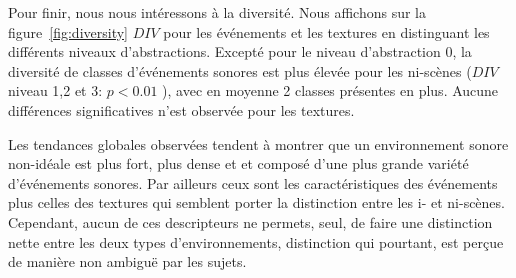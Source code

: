 Pour finir, nous nous intéressons à la diversité. Nous affichons sur la figure~\ref{fig:diversity} $DIV$ pour les événements et les textures en distinguant les différents niveaux d'abstractions. Excepté pour le niveau d'abstraction 0, la diversité de classes d'événements sonores est plus élevée pour les ni-scènes ($DIV$ niveau 1,2 et 3: $p<0.01$ ), avec en moyenne 2 classes présentes en plus. Aucune différences significatives n'est observée pour les textures.

Les tendances globales observées tendent à montrer que un environnement sonore non-idéale est plus fort, plus dense et et composé d'une plus grande variété d'événements sonores. Par ailleurs ceux sont les caractéristiques des événements plus celles des textures qui semblent porter la distinction entre les i- et ni-scènes. Cependant, aucun de ces descripteurs ne permets, seul, de faire une distinction nette entre les deux types d'environnements, distinction qui pourtant, est perçue de manière non ambiguë par les sujets. 

